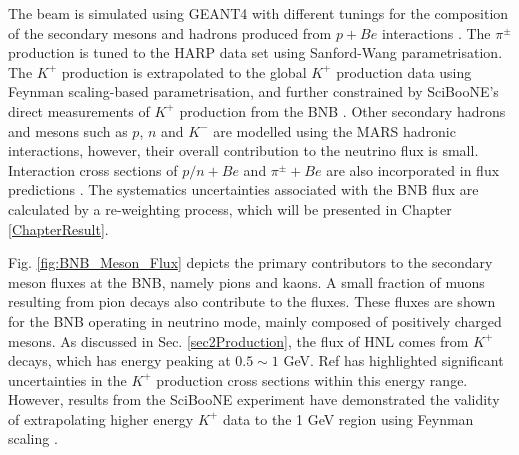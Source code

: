 The beam is simulated using GEANT4 with different tunings for the composition of the secondary mesons and hadrons produced from $p + Be$ interactions \cite{BNBMiniBooNE}.
The $\pi^{\pm}$ production is tuned to the HARP data set using Sanford-Wang parametrisation.
The $K^{+}$ production is extrapolated to the global $K^{+}$ production data using Feynman scaling-based parametrisation, and further constrained by SciBooNE's direct measurements of $K^{+}$ production from the BNB \cite{SciBooNE}. 
Other secondary hadrons and mesons such as $p$, $n$ and $K^{-}$ are modelled using the MARS hadronic interactions, however, their overall contribution to the neutrino flux is small. 
Interaction cross sections of $p/n + Be$ and $\pi^{\pm} + Be$ are also incorporated in flux predictions \cite{DavePhd}.   
The systematics uncertainties associated with the BNB flux are calculated by a re-weighting process, which will be presented in Chapter \ref{ChapterResult}.

Fig. \ref{fig:BNB_Meson_Flux} depicts the primary contributors to the secondary meson fluxes at the BNB, namely pions and kaons.
A small fraction of muons resulting from pion decays also contribute to the fluxes.
These fluxes are shown for the BNB operating in neutrino mode, mainly composed of positively charged mesons.
As discussed in Sec. \ref{sec2Production}, the flux of HNL comes from $K^{+}$ decays, which has energy peaking at $0.5 \sim 1$ GeV.
Ref \cite{BNBMiniBooNE} has highlighted significant uncertainties in the $K^{+}$ production cross sections within this energy range.
However, results from the SciBooNE experiment have demonstrated the validity of extrapolating higher energy $K^{+}$ data to the 1 GeV region using Feynman scaling \cite{SciBooNE}. 

